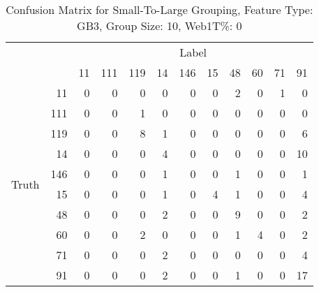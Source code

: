 	\begin{table}[htbp!]
	\begin{center}
			\begin{tabular}{ | c | r | r | r | r | r | r | r | r | r| r | r |}
			\cline{3-12}
			\multicolumn{2}{c}{} & \multicolumn{10}{|c|}{Label}\\ \cline{3-12}
			\multicolumn{2}{c|}{} & 11 & 111 & 119 & 14 & 146 & 15 & 48 & 60 & 71 & 91\\ \hline 
			\multirow{10}{*}{\begin{sideways}Truth\end{sideways}} & 11 & 0 & 0 & 0 & 0 & 0 & 0 & 2 & 0 & 1 & 0\\ \cline{2-12}
			& 111 & 0 & 0 & 1 & 0 & 0 & 0 & 0 & 0 & 0 & 0\\ \cline{2-12} 
			& 119 & 0 & 0 & 8 & 1 & 0 & 0 & 0 & 0 & 0 & 6\\ \cline{2-12} 
			& 14 & 0 & 0 & 0 & 4 & 0 & 0 & 0 & 0 & 0 & 10\\ \cline{2-12} 
			& 146 & 0 & 0 & 0 & 1 & 0 & 0 & 1 & 0 & 0 & 1\\ \cline{2-12} 
			& 15 & 0 & 0 & 0 & 1 & 0 & 4 & 1 & 0 & 0 & 4\\ \cline{2-12} 
			& 48 & 0 & 0 & 0 & 2 & 0 & 0 & 9 & 0 & 0 & 2\\ \cline{2-12} 
			& 60 & 0 & 0 & 2 & 0 & 0 & 0 & 1 & 4 & 0 & 2\\ \cline{2-12} 
			& 71 & 0 & 0 & 0 & 2 & 0 & 0 & 0 & 0 & 0 & 4\\ \cline{2-12} 
			& 91 & 0 & 0 & 0 & 2 & 0 & 0 & 1 & 0 & 0 & 17\\ \hline
	\end{tabular}
		\caption{Confusion Matrix for Small-To-Large Grouping, Feature Type: GB3, Group Size: 10, Web1T\%: 0}
		\label{tab:enron-stl-confusionmatrix}
		\end{center}	
	\end{table}
	
